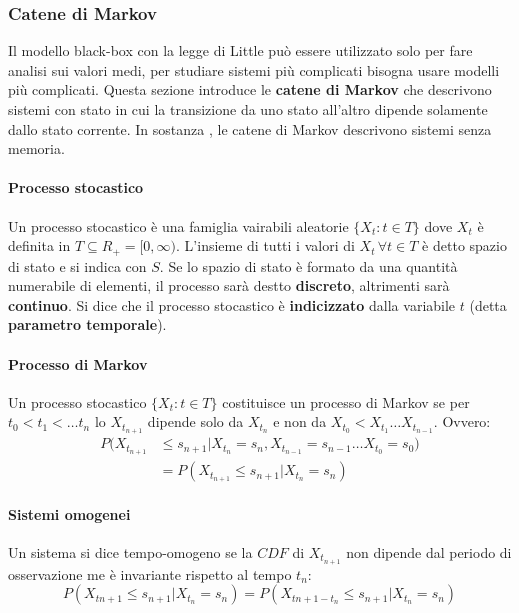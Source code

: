 \documentclass{article}
\begin{document}
\subsubsection{Catene di Markov}
Il modello black-box con la legge di Little può essere utilizzato solo per fare analisi sui 
valori medi, per studiare sistemi più complicati bisogna usare modelli più complicati. 
Questa sezione introduce le \textbf{catene di Markov} che descrivono sistemi con stato in 
cui la transizione da uno stato all'altro dipende solamente dallo stato corrente. In sostanza
, le catene di Markov descrivono sistemi senza memoria.

\paragraph{Processo stocastico}Un processo stocastico è una famiglia vairabili aleatorie 
$\{X_t: t \in T\}$ dove $X_t$ è definita in $T \subseteq R_+ = [0, \infty)$. L'insieme di 
tutti i valori di $X_t\, \forall t \in T$ è detto spazio di stato e si indica con $S$. 
Se lo spazio di stato è formato da una quantità numerabile di elementi, il processo sarà
destto \textbf{discreto}, altrimenti sarà \textbf{continuo}. Si dice che il processo
stocastico è \textbf{indicizzato} dalla variabile $t$ (detta \textbf{parametro temporale}).

\paragraph{Processo di Markov}Un processo stocastico $\{X_t: t \in T\}$ costituisce un 
processo di Markov se per $t_0 < t_1 < \dots t_n$ lo  $X_{t_{n+1}}$ dipende solo da 
$X_{t_n}$ e non da $X_{t_0} < X_{t_1} \dots X_{t_{n-1}}$. Ovvero:
\begin{align}
  P(X_{t_{n+1}} &\leq s_{n+1} | X_{t_n} = s_n, X_{t_{n-1}} = s_{n-1}\dots X_{t_0} = s_0) \\
  &= P(X_{t_{n+1}} \leq s_{n+1}|X_{t_n} = s_n)
\end{align}

\paragraph{Sistemi omogenei} Un sistema si dice tempo-omogeno se la $CDF$ di $X_{t_{n+1}}$ 
non dipende dal periodo di osservazione me è invariante rispetto al tempo $t_n$: 
\[
  P(X_{t{n+1}} \leq s_{n+1} | X_{t_n} = s_n) = P(X_{t{n+1-t_n}} \leq s_{n+1} | X_{t_n} = s_n)
\]
\end{document}
